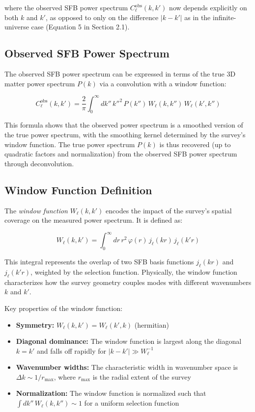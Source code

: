 where the observed SFB power spectrum $C_\ell^{\text{obs}}(k, k')$ now depends explicitly on both $k$ and $k'$, as opposed to only on the difference $|k - k'|$ as in the infinite-universe case (Equation 5 in Section 2.1).

\subsection{Observed SFB Power Spectrum}

The observed SFB power spectrum can be expressed in terms of the true 3D matter power spectrum $P(k)$ via a convolution with a window function:

\begin{equation}
C_\ell^{\text{obs}}(k, k') = \frac{2}{\pi} \int_0^\infty dk'' \, k''^2 \, P(k'') \, W_\ell(k, k'') \, W_\ell(k', k'')
\label{eq:obs_power_spectrum}
\end{equation}

This formula shows that the observed power spectrum is a smoothed version of the true power spectrum, with the smoothing kernel determined by the survey's window function. The true power spectrum $P(k)$ is thus recovered (up to quadratic factors and normalization) from the observed SFB power spectrum through deconvolution.

\subsection{Window Function Definition}

The \emph{window function} $W_\ell(k, k')$ encodes the impact of the survey's spatial coverage on the measured power spectrum. It is defined as:

\begin{equation}
W_\ell(k, k') = \int_0^\infty dr \, r^2 \, \varphi(r) \, j_\ell(kr) \, j_\ell(k'r)
\label{eq:window_function}
\end{equation}

This integral represents the overlap of two SFB basis functions $j_\ell(kr)$ and $j_\ell(k'r)$, weighted by the selection function. Physically, the window function characterizes how the survey geometry couples modes with different wavenumbers $k$ and $k'$.

Key properties of the window function:
\begin{itemize}
\item \textbf{Symmetry:} $W_\ell(k, k') = W_\ell(k', k)$ (hermitian)
\item \textbf{Diagonal dominance:} The window function is largest along the diagonal $k = k'$ and falls off rapidly for $|k - k'| \gg W_\ell^{-1}$
\item \textbf{Wavenumber widths:} The characteristic width in wavenumber space is $\Delta k \sim 1/r_{\text{max}}$, where $r_{\text{max}}$ is the radial extent of the survey
\item \textbf{Normalization:} The window function is normalized such that $\int dk'' \, W_\ell(k, k'') \sim 1$ for a uniform selection function
\end{itemize}

